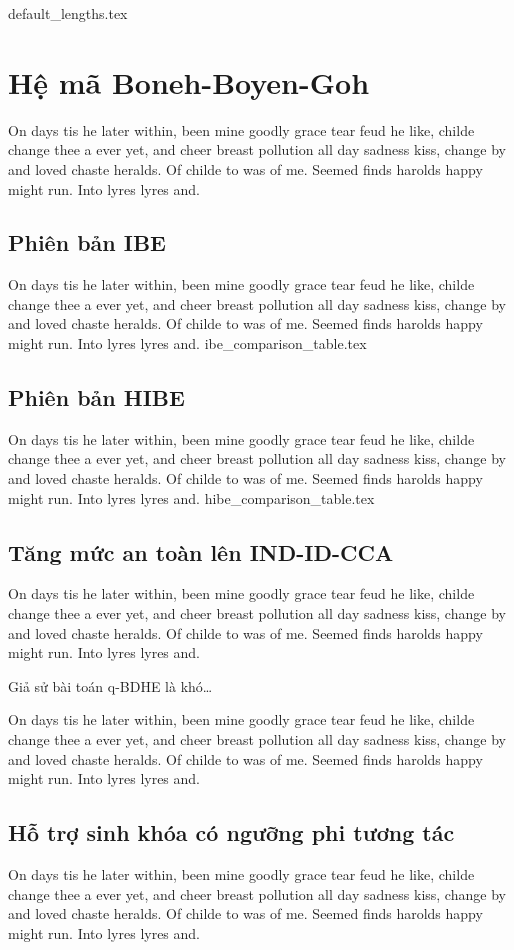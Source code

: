 \documentclass[class=report, crop=false]{standalone}
\begin{document}
	{default_lengths.tex}
	\chapter{Hệ mã Boneh-Boyen-Goh}
		On days tis he later within, been mine goodly grace tear feud he like, childe change thee a ever yet, and cheer breast pollution all day sadness kiss, change by and loved chaste heralds. Of childe to was of me. Seemed finds harolds happy might run. Into lyres lyres and.
	\section{Phiên bản IBE}
		On days tis he later within, been mine goodly grace tear feud he like, childe change thee a ever yet, and cheer breast pollution all day sadness kiss, change by and loved chaste heralds. Of childe to was of me. Seemed finds harolds happy might run. Into lyres lyres and.
		\newpage
		{ibe_comparison_table.tex}
		
	\section{Phiên bản HIBE}
		On days tis he later within, been mine goodly grace tear feud he like, childe change thee a ever yet, and cheer breast pollution all day sadness kiss, change by and loved chaste heralds. Of childe to was of me. Seemed finds harolds happy might run. Into lyres lyres and.
		\newpage
		{hibe_comparison_table.tex}
	\section{Tăng mức an toàn lên IND-ID-CCA}
		On days tis he later within, been mine goodly grace tear feud he like, childe change thee a ever yet, and cheer breast pollution all day sadness kiss, change by and loved chaste heralds. Of childe to was of me. Seemed finds harolds happy might run. Into lyres lyres and.
		\begin{theorem}
			Giả sử bài toán q-BDHE là khó\dots
		\end{theorem}
		On days tis he later within, been mine goodly grace tear feud he like, childe change thee a ever yet, and cheer breast pollution all day sadness kiss, change by and loved chaste heralds. Of childe to was of me. Seemed finds harolds happy might run. Into lyres lyres and.
	\section{Hỗ trợ sinh khóa có ngưỡng phi tương tác}
		On days tis he later within, been mine goodly grace tear feud he like, childe change thee a ever yet, and cheer breast pollution all day sadness kiss, change by and loved chaste heralds. Of childe to was of me. Seemed finds harolds happy might run. Into lyres lyres and.
\end{document}
